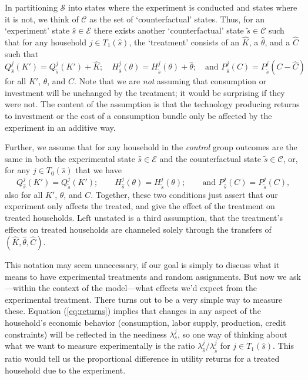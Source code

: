 \documentclass[11pt]{article}
\newcommand{\Eq}[1]{(\ref{eq:#1})}
\begin{document}
In partitioning $\mathcal{S}$ into states where the experiment is
conducted and states where it is not, we think of $\mathcal{C}$ as the
set of `counterfactual' states.  Thus, for an `experiment' state $\hat
s\in\mathcal{E}$ there exists another `counterfactual' state $\tilde s\in\mathcal{C}$
such that for any household $j\in T_1(\hat s)$, the `treatment'
consists of an $\hat K$, a $\hat\theta$, and a $\hat C$ such that
\begin{equation}
\label{eq:treatment_counterfactual}
   Q^j_{\hat s}(K') =    Q^j_{\tilde s}(K') + \hat K; \quad
   H^j_{\hat s}(\theta) = H^j_{\tilde s}(\theta) + \hat\theta;\quad
   \text{and $P^j_{\hat s}(C) = P^j_{\tilde s}(C-\hat C)$}
\end{equation}
for all $K'$, $\theta$, and $C$. Note that we are \emph{not} assuming
that consumption or investment will be unchanged by the treatment; it
would be surprising if they were not.  The content of the assumption
is that the technology producing returns to investment or the cost of
a consumption bundle only be affected by the experiment in an additive
way.  

Further, we assume that for any household in the \emph{control} group
outcomes are the same in both the experimental state $\hat
s\in\mathcal{E}$ and the counterfactual state $\tilde
s\in\mathcal{C}$, or, for any $j\in T_0(\hat s)$ that we have
\begin{equation}
\label{eq:control_counterfactual}
   Q^j_{\hat s}(K') =    Q^j_{\tilde s}(K'); \qquad
   H^j_{\hat s}(\theta) = H^j_{\tilde s}(\theta);\qquad
   \text{and $P^j_{\hat s}(C) = P^j_{\tilde s}(C)$,}
\end{equation}
also for all $K'$, $\theta$, and $C$.  Together, these two conditions
just assert that our experiment only affects the treated, and give the
effect of the treatment on treated households.  Left unstated is a
third assumption, that the treatment's effects on treated households
are channeled solely through the transfers of $(\hat K,\hat\theta,\hat
C)$.



This notation may seem unnecessary, if our goal is simply to discuss
what it means to have experimental treatments and random assignments.
But now we ask---within the context of the model---what effects we'd
expect from the experimental treatment.  There turns out to be a very
simple way to measure these.  Equation \Eq{returns} implies that
changes in any aspect of the household's economic behavior
(consumption, labor supply, production, credit constraints) will be
reflected in the neediness $\lambda^j_s$, so one way of thinking about
what we want to measure experimentally is the ratio $\lambda^j_{\hat
s}/\lambda^j_{\tilde s}$ for $j\in T_1(\hat s)$.  This ratio would
tell us the proportional difference in utility returns for a treated
household due to the experiment.
\end{document}
